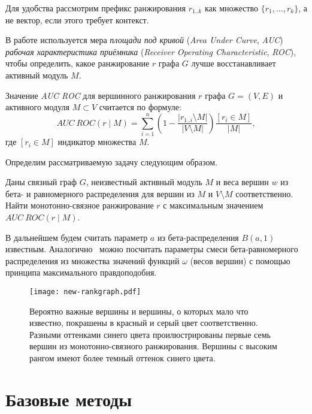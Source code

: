 Для удобства рассмотрим префикс ранжирования $r_{1..k}$ как множество $\{r_1, \ldots,
r_k\}$, а не вектор, если этого требует контекст.

В работе используется мера \emph{площади под кривой} (\emph{Area Under Curve},
\emph{AUC}) \emph{рабочая характеристика приёмника} (\emph{Receiver Operating
Characteristic}, \emph{ROC}), чтобы определить, какое ранжирование $r$ графа $G$ лучше
восстанавливает активный модуль $M$.

\begin{definition}
    Значение \emph{AUC ROC} для вершинного ранжирования $r$ графа $G = (V, E)$
    и активного модуля $M \subset V$ считается по формуле:
    \[ AUC~ROC(r \mid M) = \sum_{i=1}^n \left( 1 - \frac{|r_{1..i} \setminus M|}{|V
    \setminus M|} \right) \frac{[r_i \in M]}{|M|}, \]
    где $[r_i \in M]$ индикатор множества $M$.
\end{definition}

Определим рассматриваемую задачу следующим образом.
\begin{problem}
    Даны связный граф $G$, неизвестный активный модуль $M$ и веса вершин $w$ из
    бета- и равномерного распределения для вершин из $M$ и $V \setminus M$
    соответственно. Найти монотонно-связное ранжирование $r$ с максимальным
    значением $AUC~ROC(r \mid M)$.
\end{problem}

В дальнейшем будем считать параметр $a$ из бета-распределения $B(a, 1)$
известным. Аналогично~\cite{Dittrich2008a} можно посчитать параметры смеси
бета-равномерного распределения из множества значений функций $\omega$ (весов
вершин) с помощью принципа максимального правдоподобия.

\begin{figure}
    \centering
    \texttt{[image: new-rankgraph.pdf]}
    \caption{
        Вероятно важные вершины и вершины, о которых мало что известно, покрашены
        в красный и серый цвет соответственно.  Разными оттенками синего цвета
        проилюстрированы первые семь вершин из монотонно-связного ранжирования.
        Вершины с высоким рангом имеют более темный оттенок синего цвета.
    }%
    \label{fig:rankgraph}%
\end{figure}





\section{Базовые методы}
\label{sec_baseline}

